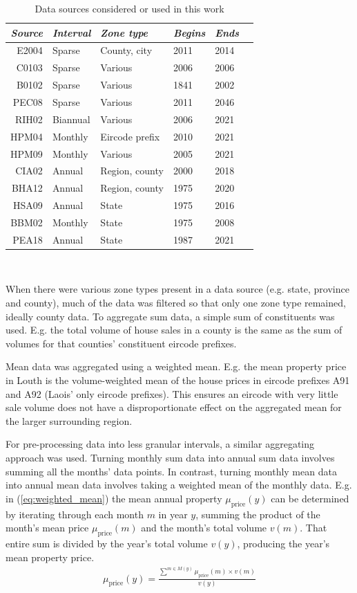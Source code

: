 \documentclass[twocolumn]{article}
\begin{document}
\begin{table}[h!]
\centering
\begin{tabularx}{0.5\textwidth}{r X X X X X}
    \textit{Source} & \textit{Interval} & \textit{Zone type} & \textit{Begins} & \textit{Ends} \\ \hline
    E2004 & Sparse & County, city & 2011 & 2014 \\ \hline
    C0103 & Sparse & Various & 2006 & 2006 \\ \hline
    B0102 & Sparse & Various & 1841 & 2002 \\ \hline
    PEC08 & Sparse & Various & 2011 & 2046 \\ \hline
    RIH02 & Biannual & Various & 2006 & 2021 \\ \hline
    HPM04 & Monthly & Eircode prefix & 2010 & 2021 \\ \hline
    HPM09 & Monthly & Various & 2005 & 2021 \\ \hline
    CIA02 & Annual & Region, county & 2000 & 2018 \\ \hline
    BHA12 & Annual & Region, county & 1975 & 2020 \\ \hline
    HSA09 & Annual & State & 1975 & 2016 \\ \hline
    BBM02 & Monthly & State & 1975 & 2008 \\ \hline
    PEA18 & Annual & State & 1987 & 2021
\end{tabularx} \\
\caption{Data sources considered or used in this work}
\label{tab:sources}
\end{table}

When there were various zone types present in a data source (e.g. state, province
and county), much of the data was filtered so that only one zone type remained,
ideally county data.  To aggregate sum data, a simple sum of constituents was used.
E.g. the total volume of house sales in a county is the same as the sum of volumes
for that counties' constituent eircode prefixes.

Mean data was aggregated using a weighted mean.  E.g. the mean property price in
Louth is the volume-weighted mean of the house prices in eircode prefixes
A91 and A92 (Laois' only eircode prefixes).  This ensures an eircode with very little
sale volume does not have a disproportionate effect on the aggregated mean for the
larger surrounding region.

For pre-processing data into less granular intervals, a similar aggregating approach
was used.  Turning monthly sum data into annual sum data involves summing all the months'
data points.  In contrast, turning monthly mean data into annual mean data involves taking a weighted
mean of the monthly data.  E.g. in (\ref{eq:weighted_mean}) the mean annual property
$\mu_{\text{price}}(y)$ can be determined by iterating through each month $m$ in
year $y$, summing the product of the month's mean price $\mu_{\text{price}}(m)$ and the month's total volume
$v(m)$.  That entire sum is divided by the year's total volume $v(y)$, producing the
year's mean property price.
\begin{align}
    \mu_{\text{price}}(y) = \frac{\sum^{m \in M(y)}\mu_{\text{price}}(m) \times v(m)}
    {v(y)}\label{eq:weighted_mean}
\end{align}
\end{document}

